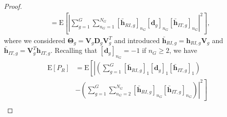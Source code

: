 \documentclass[twocolumn,10pt]{IEEEtran}
\begin{document}
\begin{proof}
\begin{align}
& =\text{E}\left[\left|\sum_{g=1}^{G}\sum_{n_G=1}^{N_G}\left[\bar{\mathbf{h}}_{RI,g}\right]_{n_G}\left[\mathbf{d}_g\right]_{n_G}\left[\bar{\mathbf{h}}_{IT,g}\right]_{n_G}\right|^2\right],
\end{align}
where we considered $\boldsymbol{\Theta}_g=\mathbf{V}_{g}\mathbf{D}_g\mathbf{V}_{g}^T$ and introduced  $\bar{\mathbf{h}}_{RI,g}=\mathbf{h}_{RI,g}\mathbf{V}_{g}$ and $\bar{\mathbf{h}}_{IT,g}=\mathbf{V}_{g}^T\mathbf{h}_{IT,g}$.
Recalling that $[\mathbf{d}_g]_{n_G}=-1$ if $n_G\geq 2$, we have
\begin{align}
\text{E}\left[P_{R}\right]
& =\text{E}\left[\left|\left(\sum_{g=1}^{G}\left[\bar{\mathbf{h}}_{RI,g}\right]_{1}\left[\mathbf{d}_g\right]_{1}\left[\bar{\mathbf{h}}_{IT,g}\right]_{1}\right)\right.\right.\\
& -\left.\left.\left(\sum_{g=1}^{G}\sum_{n_G=2}^{N_G}\left[\bar{\mathbf{h}}_{RI,g}\right]_{n_G}\left[\bar{\mathbf{h}}_{IT,g}\right]_{n_G}\right)\right|^2\right]\\

\end{align}
\end{proof}
\end{document}
